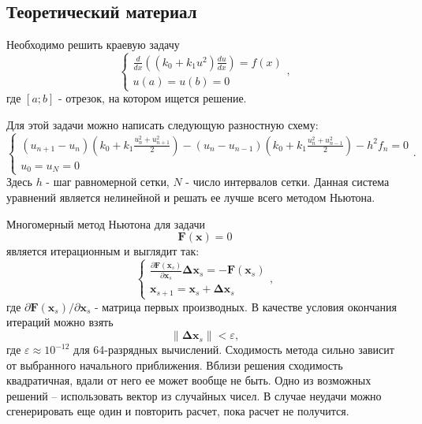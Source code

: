 \chapter{}

\section{Теоретический материал}
Необходимо решить краевую задачу
\begin{equation} \label{c5eq1}
	\begin{cases}
		 \displaystyle \frac{d}{dx} \left( \left( k_0 + k_1 u^2 \right) \frac{du}{dx} \right) = f(x) \\
		u(a) = u(b) = 0
	\end{cases},
\end{equation}
где $[a; b]$ - отрезок, на котором ищется решение.

Для этой задачи можно написать следующую разностную схему:
\begin{equation} \label{c5eq2}
	\begin{cases}
		\displaystyle \left( u_{n+1} - u_n \right) \left( k_0 + k_1 \frac{u_n^2 + u_{n+1}^2}{2} \right) - \left( u_n - u_{n-1} \right) \left( k_0 + k_1 \frac{u_n^2 + u_{n-1}^2}{2} \right) - h^2 f_n = 0 \\
		u_0 = u_N = 0
	\end{cases}.
\end{equation}
Здесь $h$ - шаг равномерной сетки, $N$ - число интервалов сетки. Данная система уравнений является нелинейной и решать ее лучше всего методом Ньютона.

Многомерный метод Ньютона для задачи
\begin{equation} \label{c5eq3}
	\mathbf{F}(\mathbf{x}) = 0
\end{equation}
является итерационным и выглядит так:
\begin{equation} \label{c5eq4}
	\begin{cases}
		\displaystyle \frac{\partial \mathbf{F}(\mathbf{x}_s)}{\partial \mathbf{x}_s}  \mathbf{\Delta x}_s = -\mathbf{F}(\mathbf{x}_s)\\
		\mathbf{x}_{s+1} = \mathbf{x}_s + \mathbf{\Delta x}_s
	\end{cases},
\end{equation}
где $\displaystyle \partial \mathbf{F}(\mathbf{x}_s)/\partial \mathbf{x}_s$ - матрица первых производных. В качестве условия окончания итераций можно взять
\begin{equation} \label{c5eq5}
	\|\mathbf{\Delta x}_s\| < \varepsilon,
\end{equation}
где $\varepsilon \approx 10^{-12}$ для 64-разрядных вычислений. Сходимость метода сильно зависит от выбранного начального приближения. Вблизи решения сходимость квадратичная, вдали от него ее может вообще не быть. Одно из возможных решений – использовать вектор из случайных чисел. В случае неудачи можно сгенерировать еще один и повторить расчет, пока расчет не получится.
